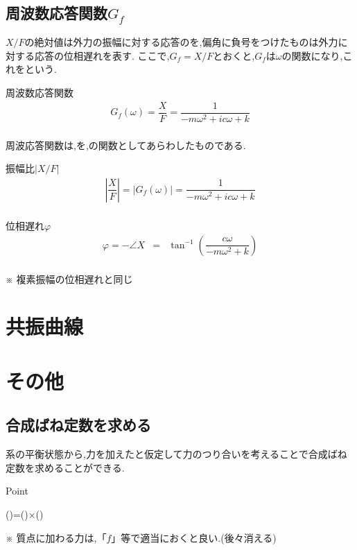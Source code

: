 \documentclass[a4paper]{jsarticle}
\begin{document}
\subsection{周波数応答関数$G_f$}
$X/F$の絶対値は外力の振幅に対する応答のを,偏角に負号をつけたものは外力に対する応答の位相遅れを表す.
ここで,$G_f=X/F$とおくと,$G_f$は$\omega$の関数になり,これをという.
\begin{itembox}[l]{周波数応答関数}
    \begin{eqnarray*}
        G_f\left(\omega\right)=\dfrac{X}{F}=\dfrac{1}{-m\omega^2+ic\omega +k}\\
    \end{eqnarray*}
\end{itembox}
周波応答関数は,を,の関数としてあらわしたものである.
\begin{itembox}[l]{振幅比$|X/F|$}
    \begin{eqnarray*}
        \left|\dfrac{X}{F}\right|=|G_f\left(\omega\right)|=\dfrac{1}{-m\omega^2+ic\omega+k}\\
    \end{eqnarray*}
\end{itembox}
\begin{itembox}[l]{位相遅れ$\varphi$}
    \begin{eqnarray*}
        \varphi=-\angle X &=&\tan^{-1}\left(\dfrac{c\omega}{-m\omega^2+k}\right)\\
    \end{eqnarray*}
    \begin{center}
        ※ 複素振幅の位相遅れと同じ
    \end{center}
\end{itembox}
\section{共振曲線}

\section{その他}
\subsection{合成ばね定数を求める}
系の平衡状態から,力を加えたと仮定して力のつり合いを考えることで合成ばね定数を求めることができる.
\begin{itembox}[l]{Point}
    \begin{center}
        ()\quad=\quad()\quad×\quad()
    \end{center}
\end{itembox}
※ 質点に加わる力は,「$f$」等で適当におくと良い.(後々消える)
\end{document}
